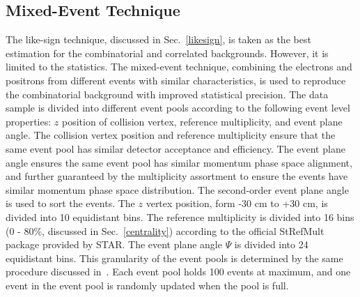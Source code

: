 \subsection{Mixed-Event Technique}
\label{mixedevent}
The like-sign technique, discussed in Sec.~\ref{likesign}, is taken as the best estimation for the combinatorial and correlated backgrounds. However, it is limited to the statistics. The mixed-event technique, combining the electrons and positrons from different events with similar characteristics, is used to reproduce the combinatorial background with improved statistical precision. The data sample is divided into different event pools according to the following event level properties: $z$ position of collision vertex, reference multiplicity, and event plane angle. The collision vertex position and reference multiplicity ensure that the same event pool has similar detector acceptance and efficiency. The event plane angle ensures the same event pool has similar momentum phase space alignment, and further guaranteed by the multiplicity assortment to ensure the events have similar momentum phase space distribution. The second-order event plane angle~\cite{EventPlane0, EventPlane1} is used to sort the events. The $z$ vertex position, form -30 cm to +30 cm, is divided into 10 equidistant bins. The reference multiplicity is divided into 16 bins (0 - 80\%, discussed in Sec.~\ref{centrality}) according to the official StRefMult package provided by STAR. The event plane angle $\Psi$ is divided into 24 equidistant bins. This granularity of the event pools is determined by the same procedure discussed in~\cite{STAR:dielectron1,dielectronJie}. Each event pool holds 100 events at maximum, and one event in the event pool is randomly updated when the pool is full. 

